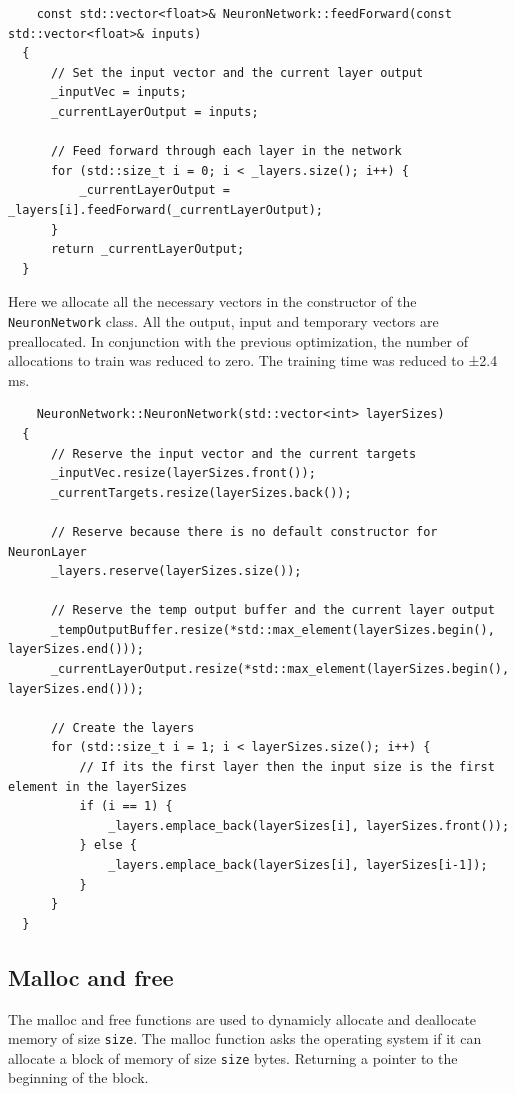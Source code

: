 \documentclass[twoside]{article}
\begin{document}
\begin{lstlisting}
    const std::vector<float>& NeuronNetwork::feedForward(const std::vector<float>& inputs)
  {   
      // Set the input vector and the current layer output
      _inputVec = inputs;
      _currentLayerOutput = inputs;
          
      // Feed forward through each layer in the network
      for (std::size_t i = 0; i < _layers.size(); i++) {
          _currentLayerOutput = _layers[i].feedForward(_currentLayerOutput);
      }
      return _currentLayerOutput;
  }
\end{lstlisting}
\vspace{2em}

\noindent
Here we allocate all the necessary vectors in the constructor of the \texttt{NeuronNetwork} class.
All the output, input and temporary vectors are preallocated. In conjunction with the previous optimization,
the number of allocations to train was reduced to zero. The training time was reduced to ±2.4 ms. \\

\begin{lstlisting}
    NeuronNetwork::NeuronNetwork(std::vector<int> layerSizes)
  {   
      // Reserve the input vector and the current targets
      _inputVec.resize(layerSizes.front());
      _currentTargets.resize(layerSizes.back());

      // Reserve because there is no default constructor for NeuronLayer
      _layers.reserve(layerSizes.size());

      // Reserve the temp output buffer and the current layer output
      _tempOutputBuffer.resize(*std::max_element(layerSizes.begin(), layerSizes.end()));    
      _currentLayerOutput.resize(*std::max_element(layerSizes.begin(), layerSizes.end()));

      // Create the layers 
      for (std::size_t i = 1; i < layerSizes.size(); i++) {   
          // If its the first layer then the input size is the first element in the layerSizes
          if (i == 1) {
              _layers.emplace_back(layerSizes[i], layerSizes.front());
          } else {
              _layers.emplace_back(layerSizes[i], layerSizes[i-1]);
          }
      }
  }
\end{lstlisting}

\subsection{Malloc and free}
The malloc and free functions are used to dynamicly allocate and deallocate memory of size \texttt{size}.
The malloc function asks the operating system if it can allocate a block of memory of size \texttt{size} bytes. Returning a pointer to the beginning of the block. \\
\end{document}
